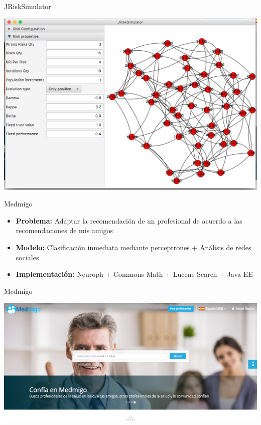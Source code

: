 \documentclass{beamer}
\begin{document}
\begin{frame}{JRiskSimulator}
    \begin{center}
        \includegraphics[width=0.9\linewidth]{Images/jrisk}
    \end{center}
\end{frame}

\begin{frame}{Medmigo}
    \begin{itemize}
        \item \textbf{Problema:} Adaptar la recomendación de un profesional de acuerdo a las recomendaciones de mis amigos
        \item \textbf{Modelo: } Clasificación inmediata mediante perceptrones + Análisis de redes sociales
        \item \textbf{Implementación: } Neuroph + Commons Math + Lucene Search + Java EE 
    \end{itemize}
\end{frame}

\begin{frame}{Medmigo}
    \begin{center}
        \includegraphics[width=0.9\linewidth]{Images/Medmigo}
    \end{center}
\end{frame}
\end{document}
